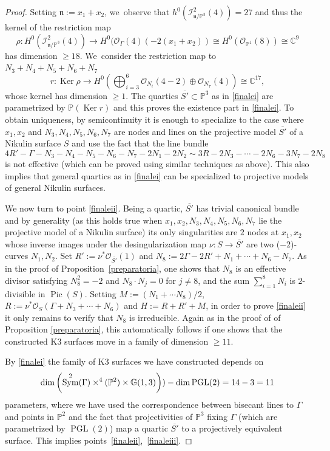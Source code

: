 \documentclass[11pt]{article}
\newcommand{\NoChangel}[1]{%
\expandafter\let\csname old\string#1\endcsname=#1
\let#1=\relax
\newcommand{#1}{\mathop{\mathcode`l="716C\csname old\string#1\endcsname\mathcode`l="7160}\nolimits}%
}
\theoremstyle{plain}
\theoremstyle{definition}
\DeclareMathOperator{\Hilb}{Hilb} \NoChangel{\Hilb}
\DeclareMathOperator{\Ker}{Ker}
\DeclareMathOperator{\PGL}{PGL}
\DeclareMathOperator{\Pic}{Pic}
\DeclareMathOperator{\Sym}{Sym}
\newcommand\CC{{\mathbb C}}
\newcommand\GG{{\mathbb G}}
\newcommand\PP{{\mathbb P}}
\renewcommand\O{{\mathcal O}}
\begin{document}
\begin{proof}
Setting $\mathfrak n:=x_1+x_2$, we~observe that $h^0(\mathcal I^2_{\mathfrak{n}/\PP^3}(4))=27$ and thus the kernel of the
restriction map
\begin{equation}\label{forza}
\rho: H^0(\mathcal I^2_{\mathfrak{n}/\PP^3}(4)) \to
H^0(\mathcal \O_{\Gamma}(4)(-2(x_1+x_2))\cong H^0(\O_{\PP^1}(8)) \cong \CC^9
\end{equation}
has dimension $\geq 18$. We~consider the restriction map to $N_3+N_4+N_5+N_6+N_7$
\begin{equation}\label{roma}
r: \Ker \rho \to H^0(\textstyle\bigoplus_{i=3}^6 \O_{N_i}(4-2)\oplus \O_{N_7}(4))\cong \CC^{17},
\end{equation}
whose kernel has dimension $\geq 1$. The quartics $\overline{S'}\subset\mathbb P^3$ as in \eqref{finalei} are parametrized by $\PP(\Ker r)$ and this proves the existence part in \eqref{finalei}. To obtain uniqueness, by semicontinuity it is enough to specialize to the case where $x_1,x_2$ and $N_3,N_4,N_5,N_6,N_7$ are nodes and lines on the projective model $\overline{S'}$ of a Nikulin surface $S$ and use the fact that the line bundle
\[
4R'-\Gamma-N_3-N_4-N_5-N_6-N_7-2N_1-2N_2 \sim 3R-2N_3-\cdots-2N_6-3N_7-2N_8
\]
is not effective (which can be proved using similar techniques as above). This also implies that general quartics as in \eqref{finalei} can be specialized to projective models of general Nikulin surfaces.

We now turn to point \eqref{finaleii}. Being a quartic, $\overline{S'}$ has trivial canonical bundle and by generality (as this holds true when $x_1,x_2,N_3,N_4,N_5,N_6,N_7$ lie the projective model of a Nikulin surface) its only singularities are $2$ nodes at $x_1,x_2$ whose inverse images under the desingularization map $\nu:S\to\overline{S'}$ are two ($-2$)-curves $N_1,N_2$. Set $R':=\nu^*\mathcal O_{\overline{S'}}(1)$ and $N_8:=2\Gamma-2R'+N_1+\cdots +N_6-N_7$. As in the proof of Proposition~\ref{preparatoria}, one shows that $N_8$ is an effective divisor satisfying $N_8^2=-2$ and $N_8\cdot N_j=0$ for $j\neq 8$, and the sum $\sum_{i=1}^8N_i$ is $2$-divisible in $\Pic(S)$. Setting $M:=(N_1+\cdots N_8)/2$, $R:=\nu^*\mathcal{O}_{ S}(\Gamma+N_3+\cdots+N_6)$ and $H:=R+R'+M$, in order to prove \eqref{finaleii} it only remains to verify that $N_8$ is irreducible. Again as in the proof of of Proposition \ref{preparatoria}, this automatically follows if one shows that the constructed K3 surfaces move in a family of dimension $\geq11$.

By \eqref{finalei} the family of K3 surfaces we have constructed depends on
\[
\dim\left(\Sym ^2(\Gamma)\times \Hilb^4(\mathbb P^2)\times \GG(1,3)\right))-\dim \PGL(2)=14-3=11
\]
parameters, where we have used the correspondence between bisecant lines to $\Gamma$ and points in $\PP^2$ and the fact that projectivities of $\mathbb P^3$ fixing $\Gamma$ (which are parametrized by $\PGL(2)$) map a quartic $\overline{S'}$ to a projectively equivalent surface. This implies points~\eqref{finaleii},~\eqref{finaleiii}.
\end{proof}
\end{document}
